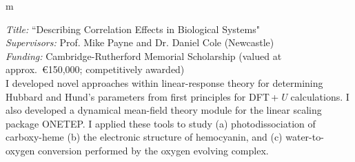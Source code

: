 \documentclass[10pt,a4paper,final]{article}
\begin{document}
\begin{tabularx}{\textwidth}{
   m{\dimexpr{}\tabcolsep}}
   \hbox{%
   }
   
   \noindent \textit{Title:} ``Describing Correlation Effects in Biological Systems"
   \\
   \textit{Supervisors:} Prof. Mike Payne and Dr. Daniel Cole (Newcastle)
   \\
   \textit{Funding:} Cambridge-Rutherford Memorial Scholarship (valued at approx.\ \euro{}150,000; competitively awarded)
   \\
   I developed novel approaches within linear-response theory for determining Hubbard and Hund's parameters from first principles for DFT\,+\,\emph{U} calculations. I also developed a dynamical mean-field theory module for the linear scaling package ONETEP. I applied these tools to study (a) photodissociation of carboxy-heme (b) the electronic structure of hemocyanin, and (c) water-to-oxygen conversion performed by the oxygen evolving complex.
   \\
\end{tabularx}
\end{document}
